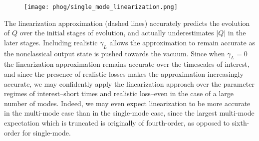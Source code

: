 \begin{figure}[htp]
\centering
\texttt{[image: phog/single\_mode\_linearization.png]}
\caption{\label{fig:phog_single_mode_linearization} }
\end{figure}

The linearization approximation (dashed lines) accurately predicts the evolution of $Q$ over the initial stages of evolution, and actually underestimates $\left|Q\right|$ in the later stages. Including realistic $\gamma_L$ allows the approximation to remain accurate as the nonclassical output state is pushed towards the vacuum. Since when $\gamma_L = 0$ the linearization approximation remains accurate over the timescales of interest, and since the presence of realistic losses makes the approximation increasingly accurate, we may confidently apply the linearization approach over the parameter regimes of interest--short times and realistic loss--even in the case of a large number of modes. Indeed, we may even expect linearization to be more accurate in the multi-mode case than in the single-mode case, since the largest multi-mode expectation which is truncated is originally of fourth-order, as opposed to sixth-order for single-mode.























